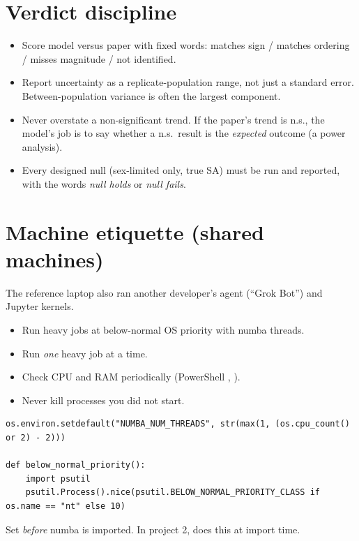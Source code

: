 \section{Verdict discipline}
\begin{itemize}
\item Score model versus paper with fixed words: matches sign / matches ordering / misses magnitude / not identified.
\item Report uncertainty as a replicate-population range, not just a standard error. Between-population variance is often the largest component.
\item Never overstate a non-significant trend. If the paper's trend is n.s., the model's job is to say whether a n.s.\ result is the \emph{expected} outcome (a power analysis).
\item Every designed null (sex-limited only, true SA) must be run and reported, with the words \emph{null holds} or \emph{null fails}.
\end{itemize}

\section{Machine etiquette (shared machines)}
The reference laptop also ran another developer's agent (``Grok Bot'') and Jupyter kernels.
\begin{itemize}
\item Run heavy jobs at below-normal OS priority with  numba threads.
\item Run \emph{one} heavy job at a time.
\item Check CPU and RAM periodically (PowerShell , ).
\item Never kill processes you did not start.
\end{itemize}
\begin{lstlisting}
os.environ.setdefault("NUMBA_NUM_THREADS", str(max(1, (os.cpu_count() or 2) - 2)))

def below_normal_priority():
    import psutil
    psutil.Process().nice(psutil.BELOW_NORMAL_PRIORITY_CLASS if os.name == "nt" else 10)
\end{lstlisting}
Set  \emph{before} numba is imported. In project 2,  does this at import time.

